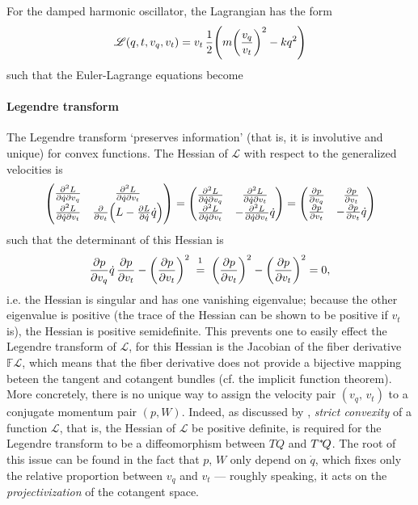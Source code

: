 
For the damped harmonic oscillator, the Lagrangian has the form
$$ \mathscr{L}(q, t, v_q, v_t) = v_t\,\frac{1}{2}\qty(m\qty(\frac{v_q}{v_t})^2 - kq^2) $$
such that the Euler-Lagrange equations become


\paragraph{Legendre transform} The Legendre transform `preserves information' (that is, it is involutive and unique) for convex functions. The Hessian of $\mathscr{L}$ with respect to the generalized velocities is
$$ \mqty(\pdv[2]{L}{\dot{q}}{v_q} & \pdv[2]{L}{\dot{q}}{v_t} \\ \pdv[2]{L}{\dot{q}}{v_t} & \pdv{}{v_t}\qty(L - \pdv{L}{\dot{q}}\dot{q}) ) = \mqty(\pdv[2]{L}{\dot{q}}{v_q} & \pdv[2]{L}{\dot{q}}{v_t} \\ \pdv[2]{L}{\dot{q}}{v_t} & -\pdv[2]{L}{\dot{q}}{v_t}\dot{q}) = \mqty(\pdv{p}{v_q} & \pdv{p}{v_t} \\ \pdv{p}{v_t} & -\pdv{p}{v_t}\dot{q}) $$
such that the determinant of this Hessian is
$$ \pdv{p}{v_q}\dot{q}\,\pdv{p}{v_t} - \qty(\pdv{p}{v_t})^2\; \stackrel{\footnotemark}{=}\; \qty(\pdv{p}{v_t})^2 - \qty(\pdv{p}{v_t})^2 = 0, $$
i.e. the Hessian is singular and has one vanishing eigenvalue; because the other eigenvalue is positive (the trace of the Hessian can be shown to be positive if $v_t$ is), the Hessian is positive semidefinite. This prevents one to easily effect the Legendre transform of $\mathscr{L}$, for this Hessian is the Jacobian of the fiber derivative $\mathbb{F}\mathscr{L}$, which means that the fiber derivative does not provide a bijective mapping beteen the tangent and cotangent bundles (cf. the implicit function theorem). More concretely, there is no unique way to assign the velocity pair $(v_q,\,v_t)$ to a conjugate momentum pair $(p, W)$. Indeed, as discussed by \citet[p. 122]{Cannas2001}, \emph{strict convexity} of a function $\mathscr{L}$, that is, the Hessian of $\mathscr{L}$ be positive definite, is required for the Legendre transform to be a diffeomorphism between $TQ$ and $T^*\!Q$. The root of this issue can be found in the fact that $p$, $W$ only depend on $\dot{q}$, which fixes only the relative proportion between $v_q$ and $v_t$ --- roughly speaking, it acts on the \emph{projectivization} of the cotangent space.
